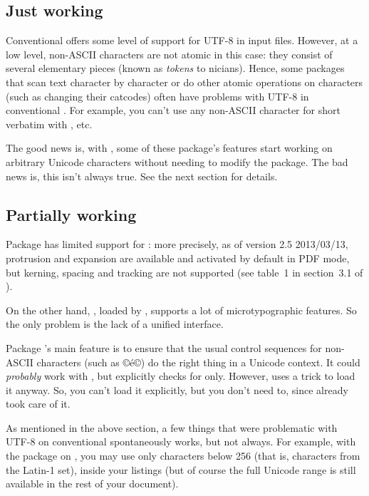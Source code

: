 \documentclass{lltxdoc}
\begin{document}
\subsection{Just working}\label{working}

Conventional \latex offers some level of support for UTF-8 in input files.
However, at a low level, non-ASCII characters are not atomic in this case:
they consist of several elementary pieces (known as \emph{tokens} to
\tex{}nicians). Hence, some packages that scan text character by character or
do other atomic operations on characters (such as changing their catcodes)
often have problems with UTF-8 in conventional \latex. For example, you can't
use any non-ASCII character for short verbatim with , etc.

The good news is, with \lualatex, some of these package's features start
working on arbitrary Unicode characters without needing to modify the package.
The bad news is, this isn't always true. See the next section for details.

\subsection{Partially working}\label{partial}

Package  has limited support for \luatex: more precisely, as of
version 2.5 2013/03/13, protrusion and expansion are available and activated
by default in PDF mode, but kerning, spacing and tracking are not supported
(see table~1 in section~3.1 of ).

On the other hand, , loaded by , supports a lot of
microtypographic features. So the only problem is the lack of a unified
interface.

Package 's main feature is to ensure that the usual control
sequences for non-ASCII characters (such as ©\'e©) do the right thing in a
Unicode context. It could \emph{probably} work with \luatex, but explicitly
checks for \xetex only. However,  uses a trick to load it anyway.
So, you can't load it explicitly, but you don't need to, since 
already took care of it.

As mentioned in the above section, a few things that were problematic with
UTF-8 on conventional \latex spontaneously works, but not always. For example,
with the  package on \lualatex, you may use only characters below
256 (that is, characters from the Latin-1 set), inside your listings (but of
course the full Unicode range is still available in the rest of your
document).
\end{document}
